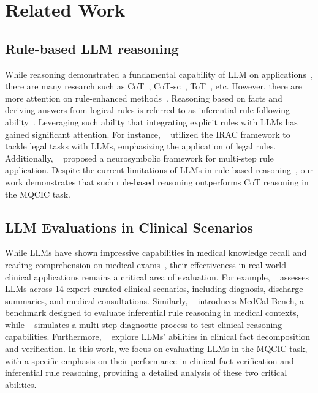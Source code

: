 \section{Related Work}
\subsection{Rule-based LLM reasoning}
While reasoning demonstrated a fundamental capability of LLM on applications~\cite{li2024fundamental}, there are many research such as CoT~\cite{cot}, CoT-sc~\cite{cot-sc}, ToT~\cite{ToT}, etc. However, there are more attention on rule-enhanced methods~\cite{LLMrule1, LLMrule2, LLMrule3}. Reasoning based on facts and deriving answers from logical rules is referred to as inferential rule following ability~\cite{rulesurvey}. Leveraging such ability that integrating explicit rules with LLMs has gained significant attention. For instance, ~\citet{chain-of-logic} utilized the IRAC framework to tackle legal tasks with LLMs, emphasizing the application of legal rules. Additionally, ~\citet{ruleapplication} proposed a neurosymbolic framework for multi-step rule application. Despite the current limitations of LLMs in rule-based reasoning~\cite{rulestress}, our work demonstrates that such rule-based reasoning outperforms CoT reasoning in the MQCIC task.

\subsection{LLM Evaluations in Clinical Scenarios}
While LLMs have shown impressive capabilities in medical knowledge recall and reading comprehension on medical exams~\cite{GPT4_medical, M-QALM}, their effectiveness in real-world clinical applications remains a critical area of evaluation. For example, ~\citet{CliMedBench} assesses LLMs across 14 expert-curated clinical scenarios, including diagnosis, discharge summaries, and medical consultations. Similarly, ~\citet{medcal} introduces MedCal-Bench, a benchmark designed to evaluate inferential rule reasoning in medical contexts, while ~\citet{Hou} simulates a multi-step diagnostic process to test clinical reasoning capabilities. Furthermore, ~\citet{factdecomp,verifact} explore LLMs' abilities in clinical fact decomposition and verification. In this work, we focus on evaluating LLMs in the MQCIC task, with a specific emphasis on their performance in clinical fact verification and inferential rule reasoning, providing a detailed analysis of these two critical abilities.
